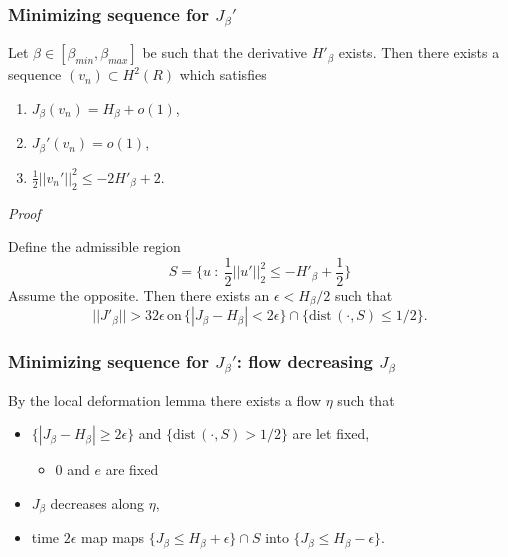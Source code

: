 \documentclass[9pt, english]{beamer}
\theoremstyle{definition}
\newcommand{\dist}{\mathrm{dist\,}}             %
\begin{document}
\begin{frame}
\frametitle{Minimizing sequence for $J_\beta'$}
\begin{lemma}
Let $\beta \in [\beta_{min}, \beta_{max}]$ be such that the
derivative $H'_\beta$ exists. Then there exists a sequence $(v_n)
\subset H^2(R)$ which satisfies
\begin{enumerate}
\item $J_\beta(v_n) = H_\beta + o(1)$,
\item $J_\beta'(v_n) = o(1)$,
\item $\frac12 ||v_n'||_2^2 \leq -2H'_\beta + 2$.
\end{enumerate}
\end{lemma}
\pause \emph{Proof}

Define the admissible region
\[
S = \{ u\ :\ \frac12 || u' ||_2^2 \leq - H'_\beta + \frac12 \}
\]
Assume the opposite. Then there exists an $\epsilon <  H_\beta/2$
such that
\[
||J'_\beta|| > 32 \epsilon \, \text{on} \, \{ |J_\beta - H_\beta| <
2 \epsilon \} \cap \{ \dist(\cdot,S) \leq 1/2 \}.
\]
\end{frame}

\begin{frame}
\frametitle{Minimizing sequence for $J_\beta'$: flow decreasing
$J_\beta$} By the local deformation lemma there exists a flow $\eta$
such that
\begin{itemize}
\item $\{ |J_\beta - H_\beta| \geq 2 \epsilon \}$ and $\{ \dist(\cdot,S) > 1/2 \}$ are let fixed,
\begin{itemize}
\item<2-> {\color{red} $0$ and $e$ are fixed}
\end{itemize}
\item $J_\beta$ decreases along $\eta$,
\item time $2\epsilon$ map maps $\{ J_\beta \leq H_\beta + \epsilon\} \cap S$ into $\{J_\beta \leq H_\beta - \epsilon\}$.
\end{itemize}
\end{frame}
\end{document}
